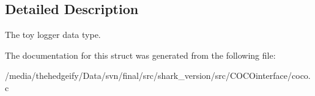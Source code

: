 \subsection{Detailed Description}
The toy logger data type. 

The documentation for this struct was generated from the following file\+:\begin{DoxyCompactItemize}
\item 
/media/thehedgeify/\+Data/svn/final/src/shark\+\_\+version/src/\+C\+O\+C\+Ointerface/coco.\+c\end{DoxyCompactItemize}
